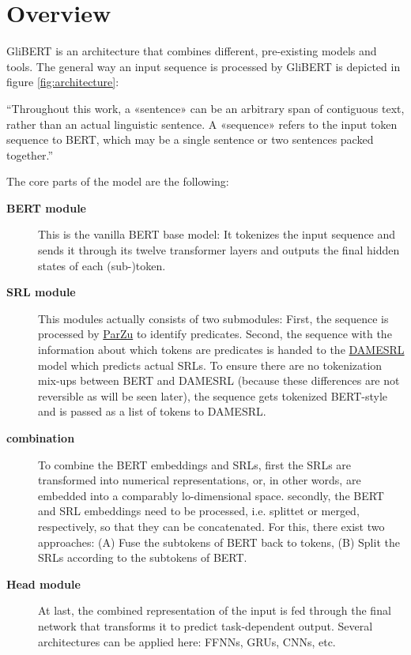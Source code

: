 
\label{chap:4_architecture}

\section{Overview}

GliBERT is an architecture that combines different, pre-existing models and tools.  The general
way an input sequence is processed by GliBERT is depicted in figure \ref{fig:architecture}:


``Throughout this work, a «sentence» can be an arbitrary span of contiguous text, rather
than an actual linguistic sentence. A «sequence» refers to the input token sequence to BERT,
which may be a single sentence or two sentences packed together.'' \citep{devlin2018bert}



The core parts of the model are the following:

\begin{description}
	\item[\textbf{BERT module}] This is the vanilla BERT base model: It tokenizes the input sequence and sends it through its twelve transformer layers and outputs the final hidden states of each (sub-)token.
  \item[\textbf{SRL module}] This modules actually consists of two submodules: First, the sequence is processed by \href{https://github.com/rsennrich/ParZu}{ParZu} \citep{sennrich2009new} to identify predicates.
	Second, the sequence with the information about which tokens are predicates is handed to the \href{https://liir.cs.kuleuven.be/software_pages/damesrl.php}{DAMESRL} model \citep{do2018flexible} which predicts actual SRLs.
	To ensure there are no tokenization mix-ups between BERT and DAMESRL (because these differences are not reversible as will be seen later), the sequence gets tokenized BERT-style and is passed as a list of tokens to DAMESRL.
  \item[\textbf{combination}] To combine the BERT embeddings and SRLs, first the SRLs are transformed into numerical representations, or, in other words, are embedded into a comparably lo-dimensional space.
	secondly, the BERT and SRL embeddings need to be processed, i.e. splittet or merged, respectively, so that they can be concatenated.
	For this, there exist two approaches:
	(A) Fuse the subtokens of BERT back to tokens, (B) Split the SRLs according to the subtokens of BERT.
  \item[\textbf{Head module}] At last, the combined representation of the input is fed through the final network that transforms it to predict task-dependent output. Several architectures can be applied here: FFNNs, GRUs, CNNs, etc.
\end{description}

